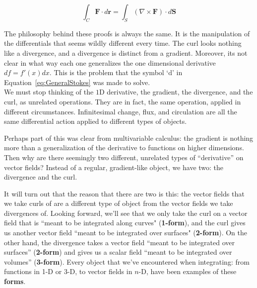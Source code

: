 \documentclass[../master.tex]{subfiles}
\begin{document}
	\begin{equation}
		\int_C \mathbf{F} \cdot d\mathbf r = \int_S (\nabla \times \mathbf{F}) \cdot d\mathbf S 
	\end{equation}
	
	The philosophy behind these proofs is always the same. It is the manipulation of the differentials that seems wildly different every time. The curl looks nothing like a divergence, and a divergence is distinct from a gradient. Moreover, its not clear in what way each one generalizes the one dimensional derivative $df = f'(x) dx$. This is the problem that the symbol `$\mathrm d$' in Equation~\eqref{eq:GeneralStokes} was made to solve.\\
	
	We must stop thinking of the $1$D derivative, the gradient, the divergence, and the curl, as unrelated operations. They are in fact, the same operation, applied in different circumstances. Infinitesimal change, flux, and circulation are all the same differential action applied to different types of objects. 
	
	Perhaps part of this was clear from multivariable calculus: the gradient is nothing more than a generalization of the derivative to functions on higher dimensions. Then why are there seemingly two different, unrelated types of ``derivative'' on vector fields? Instead of a regular, gradient-like object, we have two: the divergence and the curl. 
	
	It will turn out that the reason that there are two is this: the vector fields that we take curls of are a different type of object from the vector fields we take divergences of. Looking forward, we'll see that we only take the curl on a vector field that is ``meant to be integrated along curves" (\textbf{1-form}), and the curl gives us another vector field ``meant to be integrated over surfaces" (\textbf{2-form}). On the other hand, the divergence takes a vector field ``meant to be integrated over surfaces'' (\textbf{2-form}) and gives us a scalar field ``meant to be integrated over volumes'' (\textbf{3-form}). Every object that we've encountered when integrating: from functions in 1-D or 3-D, to vector fields in $n$-D, have been examples of these \textbf{forms}.  \\
	
\end{document}
